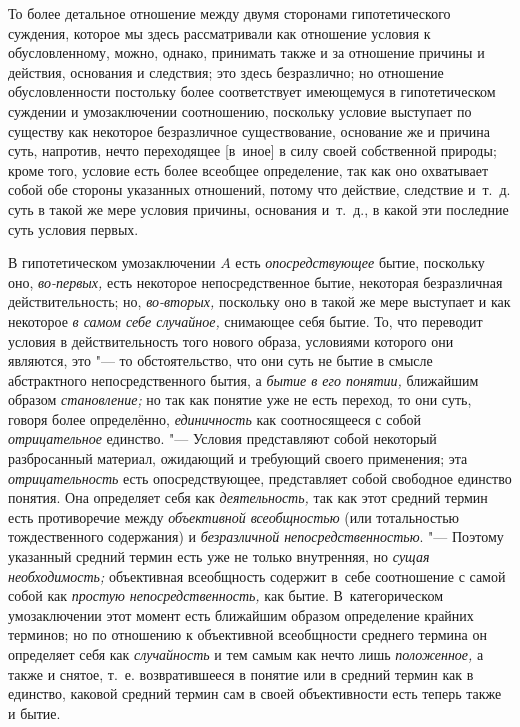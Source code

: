 То более детальное отношение между двумя сторонами
гипотетического суждения, которое мы здесь рассматривали как отношение
условия к обусловленному, можно, однако, принимать также и за отношение
причины и действия, основания и следствия; это здесь безразлично; но
отношение обусловленности постольку более соответствует имеющемуся в
гипотетическом суждении и умозаключении соотношению, поскольку условие
выступает по существу как некоторое безразличное существование, основание
же и причина суть, напротив, нечто переходящее [в~иное] в силу своей
собственной природы; кроме того, условие есть более всеобщее определение,
так как оно охватывает собой обе стороны указанных отношений, потому что
действие, следствие и~т.~д. суть в такой же мере условия причины, основания
и~т.~д., в какой эти последние суть условия первых.

В гипотетическом умозаключении $A$ есть
{\em опосредствующее} бытие, поскольку оно, {\em во-первых,} есть
некоторое непосредственное бытие, некоторая безразличная действительность;
но, {\em во-вторых,} поскольку оно в такой же мере выступает и как некоторое
{\em в самом себе случайное,}
снимающее себя бытие. То, что переводит условия в
действительность того нового образа, условиями которого они являются, это
"--- то обстоятельство, что они суть не бытие в смысле
абстрактного непосредственного бытия, а
{\em бытие в его понятии,} ближайшим образом {\em становление;} но так
как понятие уже не есть переход, то они суть, говоря более определённо,
{\em единичность} как
соотносящееся с собой {\em отрицательное} единство. "--- Условия
представляют собой некоторый разбросанный материал,
ожидающий и требующий своего применения; эта {\em отрицательность}
есть опосредствующее, представляет собой свободное единство
понятия. Она определяет себя как {\em деятельность,} так
как этот средний термин есть противоречие между
{\em объективной всеобщностью}
(или тотальностью тождественного содержания) и
{\em безразличной непосредственностью}.
"--- Поэтому указанный средний термин есть уже не только
внутренняя, но {\em сущая необходимость;} объективная всеобщность содержит
в~себе соотношение с самой собой как {\em простую непосредственность,}
как бытие. В~категорическом умозаключении этот момент есть
ближайшим образом определение крайних терминов; но по отношению к
объективной всеобщности среднего термина он определяет себя как
{\em случайность} и тем самым как нечто лишь {\em положенное,}
а также и снятое, т.~е. возвратившееся в понятие или в
средний термин как в единство, каковой средний термин сам в своей
объективности есть теперь также и бытие.

